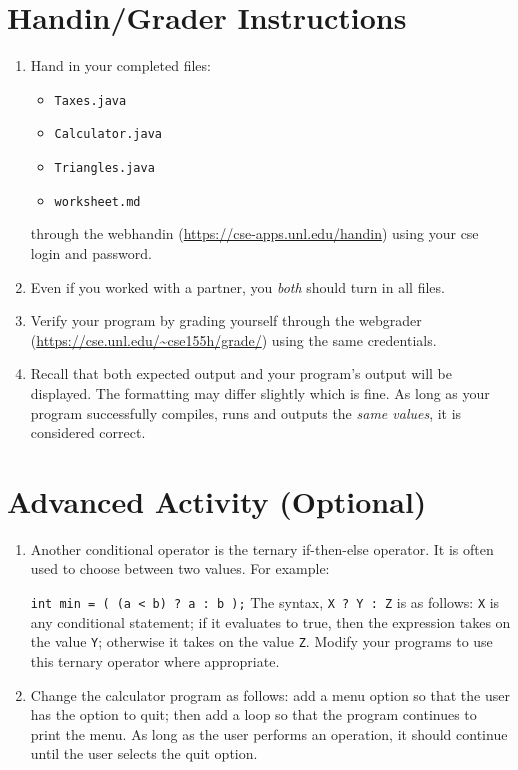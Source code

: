 \documentclass[12pt]{scrartcl}
\begin{document}
\section{Handin/Grader Instructions}

\begin{enumerate}
  \item Hand in your completed files:
    \begin{itemize}
    \item \texttt{Taxes.java}
    \item \texttt{Calculator.java}
    \item \texttt{Triangles.java}
    \item \texttt{worksheet.md}
  \end{itemize}
  through the webhandin (\url{https://cse-apps.unl.edu/handin}) 
  using your cse login and password.  
  \item Even if you worked with a partner, you \emph{both} should
  turn in all files.
  \item Verify your program by grading yourself through the
  webgrader (\url{https://cse.unl.edu/~cse155h/grade/}) using the
  same credentials.
  \item Recall that both expected output and your program's output
  will be displayed.  The formatting may differ slightly which is fine.
  As long as your program successfully compiles, runs and outputs 
  the \emph{same values}, it is considered correct.
\end{enumerate}

\section{Advanced Activity (Optional)}

\begin{enumerate}
  \item Another conditional operator is the ternary if-then-else operator.  
  	It is often used to choose between two values.  For example:
	
	\texttt{int min = ( (a < b) ? a : b );}
	The syntax, \texttt{X ? Y : Z} is as follows: \texttt{X} 
	is any conditional statement; if it evaluates to true, then the 
	expression takes on the value \texttt{Y}; otherwise it takes 
	on the value \texttt{Z}.  Modify your programs to use this 
	ternary operator where appropriate.
  \item Change the calculator program as follows: add a menu option 
	so that the user has the option to quit; then add a loop so that 
	the program continues to print the menu.  As long as the user 
	performs an operation, it should continue until the user selects 
	the quit option.
\end{enumerate}
\end{document}

